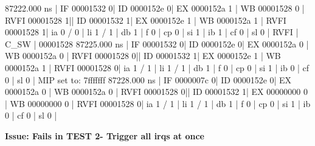 \begin{terminal}
   87222.000 ns | IF 00001532  0| ID 0000152e 0| EX 0000152a 1 | WB 00001528 0 | RVFI 00001528 1|| ID 00001532  1| EX 0000152e 1 | WB 0000152a 1 | RVFI 00001528 1| ia 0 / 0 | li 1 / 1 | db 1 | f 0 | cp 0 | si 1 | ib 1 | cf 0 | sl 0 | RVFI | C_SW     | 00001528
   87225.000 ns | IF 00001532  0| ID 0000152e 0| EX 0000152a 0 | WB 0000152a 0 | RVFI 00001528 0|| ID 00001532  1| EX 0000152e 1 | WB 0000152a 1 | RVFI 00001528 0| ia 1 / 1 | li 1 / 1 | db 1 | f 0 | cp 0 | si 1 | ib 0 | cf 0 | sl 0 |
MIP set to: 7fffffff
   87228.000 ns | IF 0000007c  0| ID 0000152e 0| EX 0000152a 0 | WB 0000152a 0 | RVFI 00001528 0|| ID 00001532  1| EX 00000000 0 | WB 00000000 0 | RVFI 00001528 0| ia 1 / 1 | li 1 / 1 | db 1 | f 0 | cp 0 | si 1 | ib 0 | cf 0 | sl 0 |
\end{terminal}


\textbf{Issue: Fails in TEST 2- Trigger all irqs at once}

